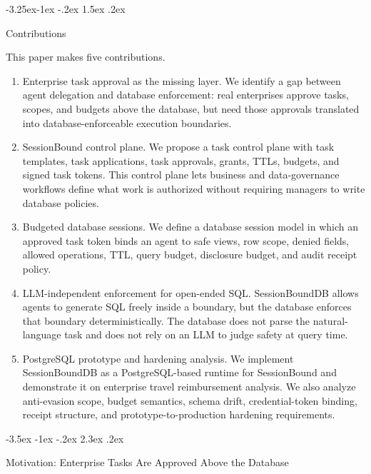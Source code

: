 \documentclass[10pt,twocolumn]{article}
\makeatletter
\renewcommand\section{\@startsection{section}{1}{\z@}%
  {-3.5ex \@plus -1ex \@minus -.2ex}%
  {2.3ex \@plus .2ex}%
  {\normalfont\Large\bfseries\raggedright}}
\renewcommand\subsection{\@startsection{subsection}{2}{\z@}%
  {-3.25ex\@plus -1ex \@minus -.2ex}%
  {1.5ex \@plus .2ex}%
  {\normalfont\large\bfseries\raggedright}}
\makeatother
\begin{document}
\hypertarget{contributions}{%
\subsection{Contributions}\label{contributions}}

This paper makes five contributions.

\begin{enumerate}
\def\labelenumi{\arabic{enumi}.}
\item
  Enterprise task approval as the missing layer. We identify a
  gap between agent delegation and database enforcement: real
  enterprises approve tasks, scopes, and budgets above the database, but
  need those approvals translated into database-enforceable execution
  boundaries.
\item
  SessionBound control plane. We propose a task control plane
  with task templates, task applications, task approvals, grants, TTLs,
  budgets, and signed task tokens. This control plane lets business and
  data-governance workflows define what work is authorized without
  requiring managers to write database policies.
\item
  Budgeted database sessions. We define a database session
  model in which an approved task token binds an agent to safe views,
  row scope, denied fields, allowed operations, TTL, query budget,
  disclosure budget, and audit receipt policy.
\item
  LLM-independent enforcement for open-ended SQL.
  SessionBoundDB allows agents to generate SQL freely inside a boundary,
  but the database enforces that boundary deterministically. The
  database does not parse the natural-language task and does not rely on
  an LLM to judge safety at query time.
\item
  PostgreSQL prototype and hardening analysis. We implement
  SessionBoundDB as a PostgreSQL-based runtime for SessionBound and
  demonstrate it on enterprise travel reimbursement analysis. We also
  analyze anti-evasion scope, budget semantics, schema drift,
  credential-token binding, receipt structure, and
  prototype-to-production hardening requirements.
\end{enumerate}


\hypertarget{motivation-enterprise-tasks-are-approved-above-the-database}{%
\section{Motivation: Enterprise Tasks Are Approved Above the
Database}\label{motivation-enterprise-tasks-are-approved-above-the-database}}
\end{document}
